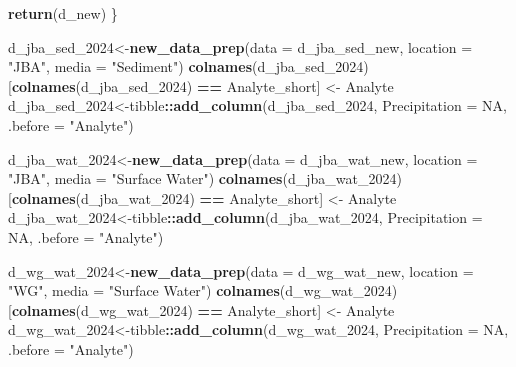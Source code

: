 \documentclass[
]{article}
\newenvironment{Shaded}{\begin{snugshade}}{\end{snugshade}}
\newcommand{\AttributeTok}[1]{\textcolor[rgb]{0.13,0.29,0.53}{#1}}
\newcommand{\ConstantTok}[1]{\textcolor[rgb]{0.56,0.35,0.01}{#1}}
\newcommand{\FunctionTok}[1]{\textcolor[rgb]{0.13,0.29,0.53}{\textbf{#1}}}
\newcommand{\NormalTok}[1]{#1}
\newcommand{\OtherTok}[1]{\textcolor[rgb]{0.56,0.35,0.01}{#1}}
\newcommand{\SpecialCharTok}[1]{\textcolor[rgb]{0.81,0.36,0.00}{\textbf{#1}}}
\newcommand{\StringTok}[1]{\textcolor[rgb]{0.31,0.60,0.02}{#1}}
\begin{document}
\begin{Shaded}
\begin{Highlighting}[]
  \FunctionTok{return}\NormalTok{(d\_new)}
\NormalTok{\}}

\NormalTok{d\_jba\_sed\_2024}\OtherTok{\textless{}{-}}\FunctionTok{new\_data\_prep}\NormalTok{(}\AttributeTok{data =}\NormalTok{ d\_jba\_sed\_new, }
              \AttributeTok{location =} \StringTok{"JBA"}\NormalTok{,}
              \AttributeTok{media =} \StringTok{"Sediment"}\NormalTok{)}
\FunctionTok{colnames}\NormalTok{(d\_jba\_sed\_2024)[}\FunctionTok{colnames}\NormalTok{(d\_jba\_sed\_2024) }\SpecialCharTok{==} \StringTok{\textquotesingle{}Analyte\_short\textquotesingle{}}\NormalTok{] }\OtherTok{\textless{}{-}} \StringTok{\textquotesingle{}Analyte\textquotesingle{}}
\NormalTok{d\_jba\_sed\_2024}\OtherTok{\textless{}{-}}\NormalTok{tibble}\SpecialCharTok{::}\FunctionTok{add\_column}\NormalTok{(d\_jba\_sed\_2024, }\AttributeTok{Precipitation =} \ConstantTok{NA}\NormalTok{, }\AttributeTok{.before =} \StringTok{"Analyte"}\NormalTok{)}

\NormalTok{d\_jba\_wat\_2024}\OtherTok{\textless{}{-}}\FunctionTok{new\_data\_prep}\NormalTok{(}\AttributeTok{data =}\NormalTok{ d\_jba\_wat\_new, }
              \AttributeTok{location =} \StringTok{"JBA"}\NormalTok{,}
              \AttributeTok{media =} \StringTok{"Surface Water"}\NormalTok{)}
\FunctionTok{colnames}\NormalTok{(d\_jba\_wat\_2024)[}\FunctionTok{colnames}\NormalTok{(d\_jba\_wat\_2024) }\SpecialCharTok{==} \StringTok{\textquotesingle{}Analyte\_short\textquotesingle{}}\NormalTok{] }\OtherTok{\textless{}{-}} \StringTok{\textquotesingle{}Analyte\textquotesingle{}}
\NormalTok{d\_jba\_wat\_2024}\OtherTok{\textless{}{-}}\NormalTok{tibble}\SpecialCharTok{::}\FunctionTok{add\_column}\NormalTok{(d\_jba\_wat\_2024, }\AttributeTok{Precipitation =} \ConstantTok{NA}\NormalTok{, }\AttributeTok{.before =} \StringTok{"Analyte"}\NormalTok{)}

\NormalTok{d\_wg\_wat\_2024}\OtherTok{\textless{}{-}}\FunctionTok{new\_data\_prep}\NormalTok{(}\AttributeTok{data =}\NormalTok{ d\_wg\_wat\_new, }
              \AttributeTok{location =} \StringTok{"WG"}\NormalTok{,}
              \AttributeTok{media =} \StringTok{"Surface Water"}\NormalTok{)}
\FunctionTok{colnames}\NormalTok{(d\_wg\_wat\_2024)[}\FunctionTok{colnames}\NormalTok{(d\_wg\_wat\_2024) }\SpecialCharTok{==} \StringTok{\textquotesingle{}Analyte\_short\textquotesingle{}}\NormalTok{] }\OtherTok{\textless{}{-}} \StringTok{\textquotesingle{}Analyte\textquotesingle{}}
\NormalTok{d\_wg\_wat\_2024}\OtherTok{\textless{}{-}}\NormalTok{tibble}\SpecialCharTok{::}\FunctionTok{add\_column}\NormalTok{(d\_wg\_wat\_2024, }\AttributeTok{Precipitation =} \ConstantTok{NA}\NormalTok{, }\AttributeTok{.before =} \StringTok{"Analyte"}\NormalTok{)}
\end{Highlighting}
\end{Shaded}
\end{document}
